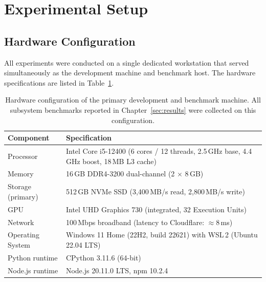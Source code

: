\documentclass[12pt,a4paper]{article}
\begin{document}
\clearpage
\section{Experimental Setup}
\label{sec:expsetup}

\subsection{Hardware Configuration}
\label{sec:expsetup:hardware}

All experiments were conducted on a single dedicated workstation that served
simultaneously as the development machine and benchmark host. The hardware
specifications are listed in Table~\ref{tab:hardware}.

\begin{table}[H]
\centering
\caption[Benchmark hardware specification]{%
Hardware configuration of the primary development and benchmark machine.
All subsystem benchmarks reported in Chapter~\ref{sec:results} were
collected on this configuration.}
\label{tab:hardware}
\begin{tabularx}{\textwidth}{@{}lX@{}}
\toprule
\textbf{Component} & \textbf{Specification} \\
\midrule
Processor        & Intel Core i5-12400 (6 cores / 12 threads, 2.5\,GHz base,
                   4.4\,GHz boost, 18\,MB L3 cache) \\
Memory           & 16\,GB DDR4-3200 dual-channel (2 $\times$ 8\,GB) \\
Storage (primary)& 512\,GB NVMe SSD (3,400\,MB/s read, 2,800\,MB/s write) \\
GPU              & Intel UHD Graphics 730 (integrated, 32 Execution Units) \\
Network          & 100\,Mbps broadband (latency to Cloudflare: $\approx$8\,ms) \\
Operating System & Windows 11 Home (22H2, build 22621) with WSL\,2
                   (Ubuntu 22.04 LTS) \\
Python runtime   & CPython 3.11.6 (64-bit) \\
Node.js runtime  & Node.js 20.11.0 LTS, npm 10.2.4 \\
\bottomrule
\end{tabularx}
\end{table}
\end{document}
